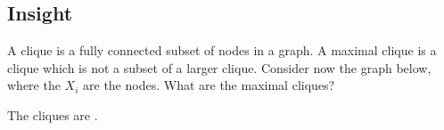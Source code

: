 \subsection*{Insight}

\begin{question}
A clique is  a fully connected subset of nodes in a graph. 
A maximal clique is a clique which is not a subset of a larger clique.
Consider now the graph below, where the $X_i$ are the nodes.  What are the maximal cliques? 
\begin{image}
\end{image}



\begin{solution}
The cliques are .
\end{solution}
\end{question}


